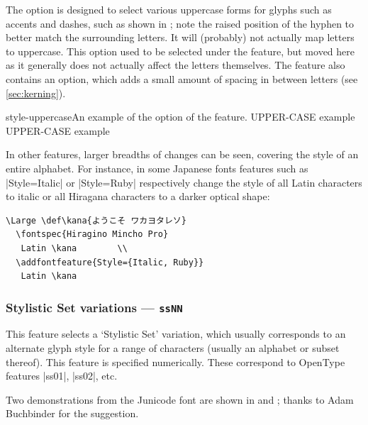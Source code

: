 \documentclass[a4paper]{l3doc}
\begin{document}
The  option is designed to select various
uppercase forms for glyphs such as accents and dashes, such as shown
in ; note the raised position of the hyphen
to better match the surrounding letters.
It will (probably) not actually map letters to uppercase.
This option used to be selected under the  feature, but moved here
as it generally does not actually affect the letters themselves.
The  feature also contains an  option,
which adds a small amount of spacing in between letters (see \vref{sec:kerning}).

\begin{Lexample}{style-uppercase}{An example of the  option of the  feature.}
   UPPER-CASE example \\
   UPPER-CASE example
\end{Lexample}


In other features, larger breadths of changes can be seen, covering
the style of an entire alphabet.
For instance, in some Japanese fonts features such as |Style=Italic| or |Style=Ruby|
respectively change the style of all Latin characters to italic or all Hiragana characters to a darker optical shape:
\begin{Verbatim}[firstline=2]
  \Large \def\kana{ようこそ ワカヨタレソ}
  \fontspec{Hiragino Mincho Pro}
   Latin \kana        \\
  \addfontfeature{Style={Italic, Ruby}}
   Latin \kana
\end{Verbatim}


\subsubsection{Stylistic Set variations --- \texttt{ssNN}}
\label{sec:ot-ss}

This feature selects a `Stylistic Set' variation,
which usually corresponds to an alternate glyph style for a range of
characters (usually an alphabet or subset thereof).
This feature is specified numerically. These correspond to OpenType
features |ss01|, |ss02|, etc.

Two demonstrations from the Junicode
font
are shown in  and ; thanks to Adam
Buchbinder for the suggestion.
\end{document}
